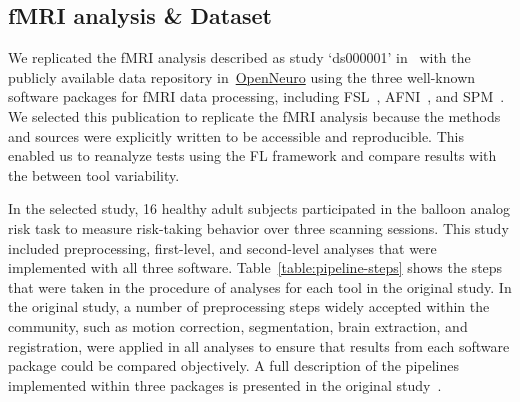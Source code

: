 \documentclass[conference]{IEEEtran}
\begin{document}
\subsection{fMRI analysis \& Dataset}

We replicated the fMRI analysis described as study `ds000001' in~\cite{bowring2019exploring}
with the publicly available data repository in~\href{https://openneuro.org/datasets/ds000001}{OpenNeuro}
using the three well-known software packages for fMRI data processing, including
FSL~\cite{jenkinson2012fsl}, AFNI~\cite{cox1996afni}, and SPM~\cite{penny2011statistical}.
We selected this publication to replicate the fMRI analysis because the methods and sources were explicitly
written to be accessible and reproducible. This enabled us to reanalyze tests using the FL framework and
compare results with the between tool variability.

In the selected study, 16 healthy adult subjects participated in the balloon analog risk task to measure
risk-taking behavior over three scanning sessions.
This study included preprocessing, first-level, and second-level analyses that were implemented with all three software.
Table~\ref{table:pipeline-steps} shows the steps that were taken in the procedure of analyses for each tool in the original study.
In the original study, a number of preprocessing steps widely accepted within the community, such as motion correction,
segmentation, brain extraction, and registration, were applied in all analyses to ensure that results from each software
package could be compared objectively.
A full description of the pipelines implemented within three packages is presented in the original
study~\cite{bowring2019exploring,schonberg2012decreasing}.
\end{document}
